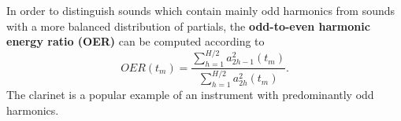 In order to distinguish sounds which contain mainly odd harmonics from sounds with a more balanced distribution of partials, the \textbf{odd-to-even harmonic energy ratio (OER)} can be computed according to
\begin{equation}
OER(t_m) = \frac{\displaystyle \sum_{h=1}^{H/2} a_{2h-1}^{2}(t_m)}{\displaystyle \sum_{h=1}^{H/2} a_{2h}^{2}(t_m)}.
\end{equation}
The clarinet is a popular example of an instrument with predominantly odd harmonics.